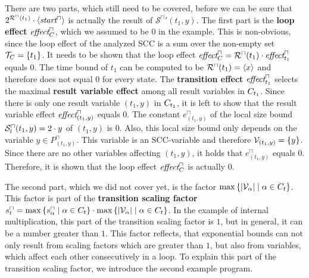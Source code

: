There are two parts, which still need to be covered, before we can be sure that $2^{{\mathcal{R}^\sqcap}(t_1)} \cdot \left\langle \emph{start}^\sqcap \right\rangle$ is actually the result of ${\mathcal{S}^\sqcap}'(t_1,y)$.
The first part is the \textbf{loop effect} $\emph{effect}^\sqcap_C$, which we assumed to be $0$ in the example.
This is non-obvious, since the loop effect of the analyzed SCC is a sum over the non-empty set $\mathcal{T}_C = \lbrace t_1 \rbrace$.
It needs to be shown that the loop effect $\emph{effect}^\sqcap_C = {\mathcal{R}^\sqcap}(t_1) \cdot \emph{effect}^\sqcap_{t_1}$ equals $0$.
The time bound of $t_1$ can be computed to be ${\mathcal{R}^\sqcap}(t_1) = \left\langle x \right\rangle$ and therefore does not equal $0$ for every state.
The \textbf{transition effect} $\emph{effect}^\sqcap_{t_1}$ selects the maximal \textbf{result variable effect} among all result variables in $C_{t_1}$.
Since there is only one result variable $(t_1,y)$ in $C_{t_1}$, it is left to show that the result variable effect $\emph{effect}^\sqcap_{(t_1,y)}$ equals $0$.
The constant $e^\sqcap_{(t_1,y)}$ of the local size bound ${\mathcal{S}^\sqcap_l}(t_1,y) = 2 \cdot y$ of $(t_1,y)$ is $0$.
Also, this local size bound only depends on the variable $y \in P^\sqcap_{(t_1,y)}$.
This variable is an SCC-variable and therefore $\mathcal{V}_{(t_1,y)} = \lbrace y \rbrace$.
Since there are no other variables affecting $(t_1,y)$, it holds that $e^\sqcap_{(t_1,y)}$ equals $0$.
Therefore, it is shown that the loop effect $\emph{effect}^\sqcap_C$ is actually $0$.

The second part, which we did not cover yet, is the factor $\max \left\lbrace \left|\mathcal{V}_\alpha\right| \mid \alpha \in C_t \right\rbrace$.
This factor is part of the \textbf{transition scaling factor} $s^\sqcap_t = \max \left\lbrace s^\sqcap_\alpha \mid \alpha \in C_t \right\rbrace \cdot \max \left\lbrace \left|\mathcal{V}_\alpha\right| \mid \alpha \in C_t \right\rbrace$.
In the example of internal multiplication, this part of the transition scaling factor is $1$, but in general, it can be a number greater than $1$.
This factor reflects, that exponential bounds can not only result from scaling factors which are greater than $1$, but also from variables, which affect each other consecutively in a loop.
To explain this part of the transition scaling factor, we introduce the second example program.

